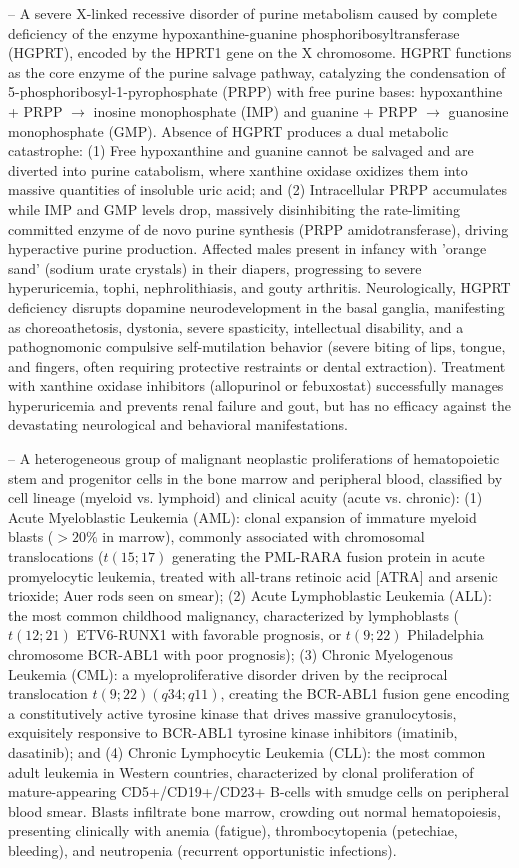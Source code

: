 -- A severe X-linked recessive disorder of purine metabolism caused by complete deficiency of the enzyme hypoxanthine-guanine phosphoribosyltransferase (HGPRT), encoded by the HPRT1 gene on the X chromosome. HGPRT functions as the core enzyme of the purine salvage pathway, catalyzing the condensation of 5-phosphoribosyl-1-pyrophosphate (PRPP) with free purine bases: hypoxanthine + PRPP $\to$ inosine monophosphate (IMP) and guanine + PRPP $\to$ guanosine monophosphate (GMP). Absence of HGPRT produces a dual metabolic catastrophe: (1) Free hypoxanthine and guanine cannot be salvaged and are diverted into purine catabolism, where xanthine oxidase oxidizes them into massive quantities of insoluble uric acid; and (2) Intracellular PRPP accumulates while IMP and GMP levels drop, massively disinhibiting the rate-limiting committed enzyme of de novo purine synthesis (PRPP amidotransferase), driving hyperactive purine production. Affected males present in infancy with 'orange sand' (sodium urate crystals) in their diapers, progressing to severe hyperuricemia, tophi, nephrolithiasis, and gouty arthritis. Neurologically, HGPRT deficiency disrupts dopamine neurodevelopment in the basal ganglia, manifesting as choreoathetosis, dystonia, severe spasticity, intellectual disability, and a pathognomonic compulsive self-mutilation behavior (severe biting of lips, tongue, and fingers, often requiring protective restraints or dental extraction). Treatment with xanthine oxidase inhibitors (allopurinol or febuxostat) successfully manages hyperuricemia and prevents renal failure and gout, but has no efficacy against the devastating neurological and behavioral manifestations.

-- A heterogeneous group of malignant neoplastic proliferations of hematopoietic stem and progenitor cells in the bone marrow and peripheral blood, classified by cell lineage (myeloid vs. lymphoid) and clinical acuity (acute vs. chronic): (1) Acute Myeloblastic Leukemia (AML): clonal expansion of immature myeloid blasts ($>20\%$ in marrow), commonly associated with chromosomal translocations ($t(15;17)$ generating the PML-RARA fusion protein in acute promyelocytic leukemia, treated with all-trans retinoic acid [ATRA] and arsenic trioxide; Auer rods seen on smear); (2) Acute Lymphoblastic Leukemia (ALL): the most common childhood malignancy, characterized by lymphoblasts ($t(12;21)$ ETV6-RUNX1 with favorable prognosis, or $t(9;22)$ Philadelphia chromosome BCR-ABL1 with poor prognosis); (3) Chronic Myelogenous Leukemia (CML): a myeloproliferative disorder driven by the reciprocal translocation $t(9;22)(q34;q11)$, creating the BCR-ABL1 fusion gene encoding a constitutively active tyrosine kinase that drives massive granulocytosis, exquisitely responsive to BCR-ABL1 tyrosine kinase inhibitors (imatinib, dasatinib); and (4) Chronic Lymphocytic Leukemia (CLL): the most common adult leukemia in Western countries, characterized by clonal proliferation of mature-appearing CD5+/CD19+/CD23+ B-cells with smudge cells on peripheral blood smear. Blasts infiltrate bone marrow, crowding out normal hematopoiesis, presenting clinically with anemia (fatigue), thrombocytopenia (petechiae, bleeding), and neutropenia (recurrent opportunistic infections).

